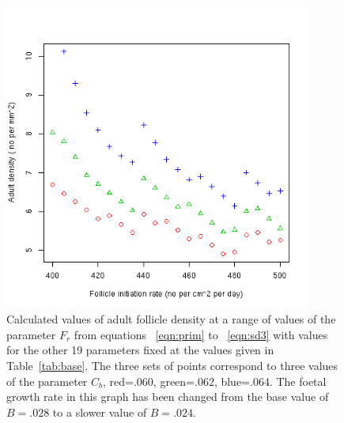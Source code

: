 %

\begin{figure}[!h]
  \centering
   \includegraphics[width=0.9\textwidth]{slowfollinitratedens.png}
  \caption{Calculated values of adult follicle density at a range of values of the parameter $F_{r}$  from equations ~\ref{eqn:prim} to ~\ref{eqn:sd3} with values for the other 19  parameters fixed at the values given in Table~\ref{tab:base}. The three sets of points correspond to three values of the parameter $C_{b}$, red=.060, green=.062, blue=.064. The foetal growth rate in this graph has been changed from the base value of $B=.028$ to a slower value of $B=.024$.}
  \label{fig:slowfollinitratedens}
\end{figure}

%

